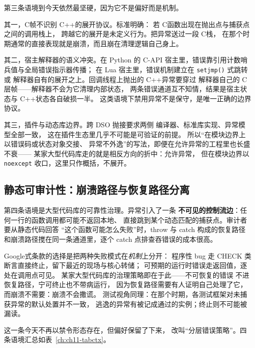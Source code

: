 \documentclass[12pt,a4paper,fontset=fandol]{ctexbook}
\newcommand{\Fn}[1]{\texttt{#1()}}
\newcommand{\Tp}[1]{\texttt{#1}}
\newcommand{\Lang}[1]{\textsf{#1}}
\newcommand{\CL}{\Lang{C}}
\newcommand{\CPP}{\Lang{C++}}
\newcommand{\DomGo}{\Lang{Google}}
\begin{document}
第三条语境到今天依然最坚硬，因为它不是偏好而是机制。

其一，\CL 帧不识别 \CPP 的展开协议。标准明确：
若 \CL 函数出现在抛出点与捕获点之间的调用栈上，
跨越它的展开是未定义行为。把异常送过一段 \CL 栈，
在那个时期通常的直接表现就是崩溃，而且崩在清理逻辑自己身上。

其二，宿主解释器的语义冲突。在 \Lang{Python} 的 C-API
宿主里，错误靠引用计数哨兵值与全局错误指示器传播；
在 \Lang{Lua} 宿主里，错误机制建立在 \Fn{setjmp} 式跳转或
解释器自有的展开之上。回调线程上抛出的 \CPP 异常要穿过
解释器自己的 C 层帧——解释器不会为它清理内部状态，
两条错误通道互不知情，结果是宿主状态与 \CPP 状态各自破损一半。
这类语境下禁用异常不是保守，是唯一正确的边界协议。

其三，插件与动态库边界。跨 DSO 抛接要求两侧
编译器、标准库实现、异常模型全部一致，
这在插件生态里几乎不可能是可验证的前提。
所以``在模块边界上以错误码或状态对象交接、
异常不外逸''的写法，即便在允许异常的工程里也长盛不衰——
某家大型代码库走的就是相反方向的折中：允许异常，
但在模块边界以 \Tp{noexcept} 收口，这里只作概括，不展开。

\subsection{静态可审计性：崩溃路径与恢复路径分离}
\label{ch:ch11-audit}

第四条语境是大型代码库的可靠性治理。异常引入了一条
\textbf{不可见的控制流边}：任何一行的函数调用都可能不返回本地、
直接跳到某个动态匹配的捕获点。审计者要从静态代码回答
``这个函数可能怎么失败''时，throw 与 catch 构成的恢复路径
和崩溃路径搅在同一条通道里，逐个 catch 点排查吞错误的成本很高。

\DomGo 式条款的选择是把两种失败模式在\emph{机制}上分开：
程序性 bug 走 CHECK 类断言直接终止，留下最近的现场与核心转储；
可预期的运行时错误走返回值，逐处在调用点可见。
某家大型代码库的治理策略即在于此——不可恢复的错误
不进恢复路径，宁可终止也不带病运行，
因为恢复路径需要有人证明自己处理了它，
而崩溃不需要：崩溃不会撒谎。
测试视角同理：在那个时期，各测试框架对未捕获异常的默认处置并不一致，
逃逸的异常有被记成通过的实例；终止则不可能被漏读。

这一条今天不再以禁令形态存在，但偏好保留了下来，
改叫``分层错误策略''。四条语境汇总如表~\ref{ch:ch11-tabctx}。
\end{document}
